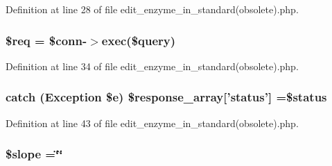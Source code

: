 Definition at line 28 of file edit\-\_\-enzyme\-\_\-in\-\_\-standard(obsolete).\-php.

\hypertarget{edit__enzyme__in__standard_07obsolete_08_8php_a63a7a283ea5dee8af1e2d5a3435bf370}{
\subsubsection[{\$req}]{\setlength{\rightskip}{0pt plus 5cm}\$req = \$conn-\/$>$exec(\$query)}}\label{edit__enzyme__in__standard_07obsolete_08_8php_a63a7a283ea5dee8af1e2d5a3435bf370}


Definition at line 34 of file edit\-\_\-enzyme\-\_\-in\-\_\-standard(obsolete).\-php.

\hypertarget{edit__enzyme__in__standard_07obsolete_08_8php_a8452fb8131316637a04e25f5fde066d9}{
\subsubsection[{\$response\-\_\-array}]{\setlength{\rightskip}{0pt plus 5cm}catch (Exception \$e) \$response\-\_\-array\mbox{[}'status'\mbox{]} =\$status}}\label{edit__enzyme__in__standard_07obsolete_08_8php_a8452fb8131316637a04e25f5fde066d9}


Definition at line 43 of file edit\-\_\-enzyme\-\_\-in\-\_\-standard(obsolete).\-php.

\hypertarget{edit__enzyme__in__standard_07obsolete_08_8php_aa6841113bca2f461aae7a334e615c44f}{
\subsubsection[{\$slope}]{\setlength{\rightskip}{0pt plus 5cm}\$slope =\char`\"{}\char`\"{}}}\label{edit__enzyme__in__standard_07obsolete_08_8php_aa6841113bca2f461aae7a334e615c44f}



